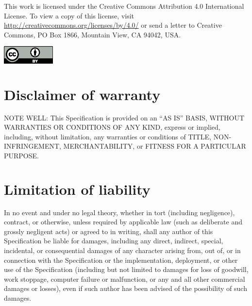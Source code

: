 \documentclass{uavcandoc}
\begin{document}
\begin{titlepage}
This work is licensed under the Creative Commons Attribution 4.0 International License.
To view a copy of this license, visit \url{http://creativecommons.org/licenses/by/4.0/}
or send a letter to Creative Commons, PO Box 1866, Mountain View, CA 94042, USA.

\begin{center}
    \includegraphics[width=0.2\textwidth]{cc-by}
\end{center}

\BeginRightColumn

\section*{Disclaimer of warranty}

NOTE WELL: This Specification is provided on an ``AS IS'' BASIS, WITHOUT WARRANTIES OR CONDITIONS OF ANY KIND,
express or implied, including, without limitation, any warranties or conditions of
TITLE, NON-INFRINGEMENT, MERCHANTABILITY, or FITNESS FOR A PARTICULAR PURPOSE.

\BeginRightColumn

\section*{Limitation of liability}

In no event and under no legal theory, whether in tort (including negligence), contract, or otherwise,
unless required by applicable law (such as deliberate and grossly negligent acts) or agreed to in writing,
shall any author of this Specification be liable for damages,
including any direct, indirect, special, incidental, or consequential damages of any character arising
from, out of, or in connection with the Specification or the implementation, deployment,
or other use of the Specification (including but not limited to damages for loss of goodwill,
work stoppage, computer failure or malfunction, or any and all other commercial damages or losses),
even if such author has been advised of the possibility of such damages.

\end{titlepage}

\tableofcontents
\BeginRightColumn
\listoftables
\BeginRightColumn
\listoffigures

\mainmatter







\end{document}
